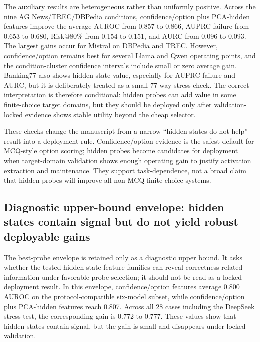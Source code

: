 \documentclass[preprint,12pt,authoryear]{elsarticle}
\begin{document}
The auxiliary results are heterogeneous rather than uniformly positive. Across the nine AG News/TREC/DBPedia conditions, confidence/option plus PCA-hidden features improve the average AUROC from 0.857 to 0.866, AUPRC-failure from 0.653 to 0.680, Risk@80\% from 0.154 to 0.151, and AURC from 0.096 to 0.093. The largest gains occur for Mistral on DBPedia and TREC. However, confidence/option remains best for several Llama and Qwen operating points, and the condition-cluster confidence intervals include small or zero average gain. Banking77 also shows hidden-state value, especially for AUPRC-failure and AURC, but it is deliberately treated as a small 77-way stress check. The correct interpretation is therefore conditional: hidden probes can add value in some finite-choice target domains, but they should be deployed only after validation-locked evidence shows stable utility beyond the cheap selector.


\FloatBarrier

These checks change the manuscript from a narrow ``hidden states do not help'' result into a deployment rule. Confidence/option evidence is the safest default for MCQ-style option scoring; hidden probes become candidates for deployment when target-domain validation shows enough operating gain to justify activation extraction and maintenance. They support task-dependence, not a broad claim that hidden probes will improve all non-MCQ finite-choice systems.


\subsection{Diagnostic upper-bound envelope: hidden states contain signal but do not yield robust deployable gains}
The best-probe envelope is retained only as a diagnostic upper bound. It asks whether the tested hidden-state feature families can reveal correctness-related information under favorable probe selection; it should not be read as a locked deployment result. In this envelope, confidence/option features average 0.800 AUROC on the protocol-compatible six-model subset, while confidence/option plus PCA-hidden features reach 0.807. Across all 28 cases including the DeepSeek stress test, the corresponding gain is 0.772 to 0.777. These values show that hidden states contain signal, but the gain is small and disappears under locked validation.





\end{document}

